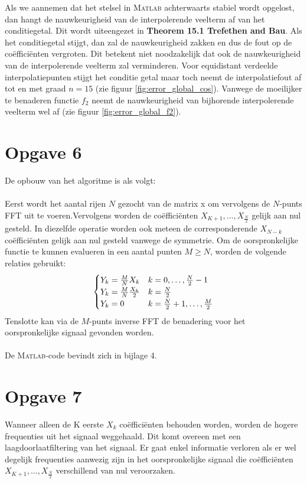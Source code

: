 \documentclass[a4paper]{article}
\newcommand{\opgave}[1]{\section*{Opgave #1}}
\begin{document}
Als we aannemen dat het stelsel in \textsc{Matlab} achterwaarts stabiel wordt opgelost, dan hangt de nauwkeurigheid van de interpolerende veelterm af van het conditiegetal. Dit wordt uiteengezet in \textbf{Theorem 15.1 Trefethen and Bau}. Als het conditiegetal stijgt, dan zal de nauwkeurigheid zakken en dus de fout op de co\"effici\"enten vergroten. Dit betekent niet noodzakelijk dat ook de nauwkeurigheid van de interpolerende veelterm zal verminderen. Voor equidistant verdeelde interpolatiepunten stijgt het conditie getal maar toch neemt de interpolatiefout af tot en met graad $n=15$ (zie figuur \ref{fig:error_global_cos}). Vanwege de moeilijker te benaderen functie $f_{2}$ neemt de nauwkeurigheid van bijhorende interpolerende veelterm wel af (zie figuur \ref{fig:error_global_f2}). 
\opgave{6}
De opbouw van het algoritme is als volgt:
\paragraph*{}
Eerst wordt het aantal rijen $N$ gezocht van de matrix x om vervolgens de $N$-punts FFT uit te voeren.Vervolgens worden de co\"{e}ffici\"{e}nten $X_{K+1}, \dots ,X_{\frac{N}{2}}$ gelijk aan nul gesteld. In diezelfde operatie worden ook meteen de corresponderende $X_{N-k}$ co\"{e}ffici\"{e}nten gelijk aan nul gesteld vanwege de symmetrie. Om de oorspronkelijke functie te kunnen evalueren in een aantal punten $M \geq N$, worden de volgende relaties gebruikt:
\begin{equation}
    \centering
        \begin{cases}
            Y_k=\frac{M}{N}X_k & k=0,\dots,\frac{N}{2}-1 \\
            Y_k=\frac{M}{N}\frac{X_k}{2} & k=\frac{N}{2} \\
            Y_k=0 & k=\frac{N}{2}+1,\dots,\frac{M}{2}
        \end{cases}
\end{equation}
Tenslotte kan via de $M$-punts inverse FFT de benadering voor het oorspronkelijke signaal gevonden worden.
\paragraph*{}
De \textsc{Matlab}-code bevindt zich in bijlage 4.
\opgave{7}
Wanneer alleen de K eerste $X_k$ co\"{e}ffici\"{e}nten behouden worden, worden de hogere frequenties uit het signaal weggehaald. Dit komt overeen met een laagdoorlaatfiltering van het signaal. Er gaat enkel informatie verloren als er wel degelijk frequenties aanwezig zijn in het oorspronkelijke signaal die co\"{e}ffici\"{e}nten $X_{K+1}, \dots ,X_{\frac{N}{2}}$ verschillend van nul veroorzaken.
\end{document}
